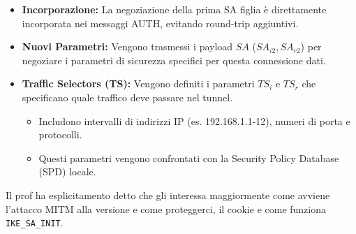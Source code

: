 \documentclass[a4paper, 11pt]{article}
\begin{document}
\begin{itemize}
    \item \textbf{Incorporazione:} La negoziazione della prima SA figlia è direttamente incorporata nei messaggi AUTH, evitando round-trip aggiuntivi.
    \item \textbf{Nuovi Parametri:} Vengono trasmessi i payload $SA$ ($SA_{i2}, SA_{r2}$) per negoziare i parametri di sicurezza specifici per questa connessione dati.
    \item \textbf{Traffic Selectors (TS):} Vengono definiti i parametri $TS_i$ e $TS_r$ che specificano quale traffico deve passare nel tunnel.
    \begin{itemize}
        \item Includono intervalli di indirizzi IP (es. 192.168.1.1-12), numeri di porta e protocolli.
        \item Questi parametri vengono confrontati con la Security Policy Database (SPD) locale.
    \end{itemize}
\end{itemize}

\begin{tcolorbox}[colback=blue!5,colframe=blue!40!black,title=PER L'ESAME]
Il prof ha esplicitamento detto che gli interessa maggiormente come avviene l'attacco MITM alla versione e come proteggerci, il cookie e come funziona \texttt{IKE\_SA\_INIT}.
\end{tcolorbox}
\end{document}
